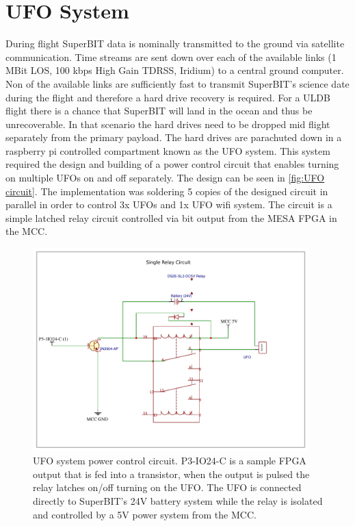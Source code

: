 \section{UFO System}
During flight SuperBIT data is nominally transmitted to the ground via satellite communication. Time streams are sent down over each of the
available links (1 MBit LOS, 100 kbps High Gain TDRSS, Iridium) to a central ground computer. Non of the available links are sufficiently fast to transmit SuperBIT's science date during the flight and therefore a hard drive recovery is required.
For a ULDB flight there is a chance that SuperBIT will land in the ocean and thus be unrecoverable. In that scenario the hard drives need to be dropped mid flight separately from the primary payload. The hard drives are parachuted down in a raspberry pi controlled compartment known as the UFO system. This system required the design and building of a power control circuit that enables turning on multiple UFOs on and off separately. The design can be seen in \autoref{fig:UFO circuit}. The implementation was soldering 5 copies of the designed circuit in parallel in order to control 3x UFOs and 1x UFO wifi system. The circuit is a simple latched relay circuit controlled via bit output from the MESA FPGA in the MCC. 

\begin{figure}
    \begin{small}
        \begin{center}
            \includegraphics[width=0.95\textwidth]{Hardware/figs/UFO_circ.pdf}
        \end{center}
        \caption{UFO system power control circuit. P3-IO24-C is a sample FPGA output that is fed into a transistor, when the output is pulsed the relay latches on/off turning on the UFO. The UFO is connected directly to SuperBIT's 24V battery system while the relay is isolated and controlled by a 5V power system from the MCC.}
        \label{fig:UFO circuit}
    \end{small}
\end{figure}



